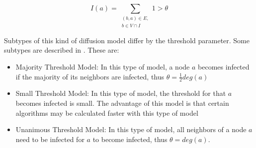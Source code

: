 \begin{equation}
    I(a) = \sum\limits_{\substack{(b,a)\in E, \\ b \in V \cap I}}
    1 > \theta    
    \label{eq:threshold}
\end{equation}

Subtypes of this kind of diffusion model differ by the threshold parameter.
Some subtypes are described in \cite{diffusionbasics}. These are:

\begin{itemize}
    \item Majority Threshold Model: In this type of model, a node $a$ becomes
    infected if the majority of its neighbors are infected, thus 
    $\theta = \frac{1}{2}deg(a)$
    \item Small Threshold Model: In this type of model, the threshold for that
    $a$ becomes infected is small. The advantage of this model is that 
    certain algorithms may be calculated faster with this type of model 
    \cite{diffusionbasics} 
    \item Unanimous Threshold Model: In this type of model, all neighbors 
    of a node $a$ need to be infected for $a$ to become infected, thus
    $\theta = deg(a)$.
\end{itemize}


